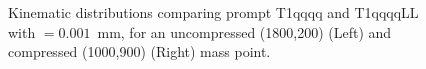 \begin{figure}[h!]
\begin{center}
     \\
     ~
    \caption{Kinematic distributions comparing prompt T1qqqq and T1qqqqLL with \ctau$=0.001$~mm, for an 
        uncompressed (1800,200) (Left) and compressed (1000,900) (Right) mass point.}
    \label{fig:T1qqqqLLvsT1qqqq}
  \end{center}
\end{figure}


